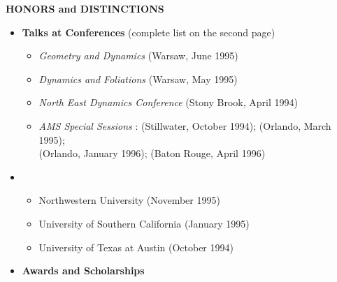  \hspace{-.29in}
{\bf  HONORS and DISTINCTIONS}  
\begin{itemize}

\item {\bf Talks at Conferences} (complete list on the second page)
\begin{itemize}
\vspace{-.09in}
\item  {\it Geometry and Dynamics } (Warsaw, June 1995)
\vspace{-.09in}

\item {\it Dynamics and Foliations } (Warsaw, May 1995)
\vspace{-.09in}
\item  {\it North East Dynamics Conference } (Stony Brook, April 1994)
\vspace{-.09in}
\item {\it AMS Special Sessions }:  
(Stillwater, October 1994); (Orlando, March 1995); \\(Orlando, January 1996); (Baton Rouge, April 1996)
\end{itemize}

\item \vspace{-.04in}{\bf  Seminars and Colloquia}
\begin{itemize}
\vspace{-.06in}
\item Northwestern University (November 1995) 
\vspace{-.06in}
\item University of Southern California (January 1995)
\vspace{-.06in}
 \item University of Texas at Austin (October 1994)
\end{itemize}


\item {\bf Awards and Scholarships}

\end{itemize}

